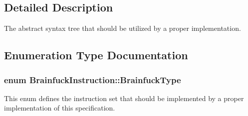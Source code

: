 \subsection{Detailed Description}
The abstract syntax tree that should be utilized by a proper implementation. 



\subsection{Enumeration Type Documentation}
\hypertarget{group__ast_ga536105595916938ef76e66bb1cdf7b2b}{}
\subsubsection[{Brainfuck\+Type}]{\setlength{\rightskip}{0pt plus 5cm}enum {\bf Brainfuck\+Instruction\+::\+Brainfuck\+Type}}\label{group__ast_ga536105595916938ef76e66bb1cdf7b2b}


This enum defines the instruction set that should be implemented by a proper implementation of this specification. 

